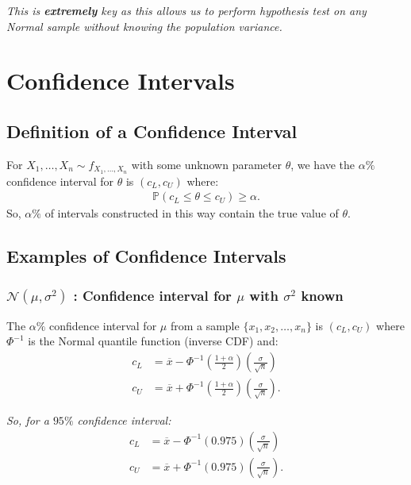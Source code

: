 \documentclass[a4paper, 12pt, twoside]{article}
\begin{document}
\textit{This is \textbf{extremely} key as this allows us to perform hypothesis
    test on any Normal sample without knowing the population variance.}

\newpage

\section{Confidence Intervals}

\subsection{Definition of a Confidence Interval}

For $X_1, \ldots, X_n \sim f_{X_1, \ldots, X_n}$ with some unknown
parameter $\theta$, we have the $\alpha\%$ confidence interval
for $\theta$ is $(c_L, c_U)$ where:
\begin{align*}
    \mathbb{P}(c_L \leq \theta \leq c_U) \geq \alpha.
\end{align*}
So, $\alpha\%$ of intervals constructed in this way contain the
true value of $\theta$.

\subsection{Examples of Confidence Intervals}

\subsubsection{$\mathcal{N}(\mu, \sigma^2)$ : Confidence
    interval for $\mu$ with $\sigma^2$ known}

The $\alpha\%$ confidence interval for $\mu$ from a sample
$\{x_1, x_2, \ldots, x_n\}$ is $(c_L, c_U)$ where $\Phi^{-1}$ is the
Normal quantile function (inverse CDF) and:
\begin{align*}
    c_L & = \overline{x} - \Phi^{-1}\left(\frac{1 + \alpha}{2}\right)
    \left(\frac{\sigma}{\sqrt{n}}\right)                              \\
    c_U & = \overline{x} + \Phi^{-1}\left(\frac{1 + \alpha}{2}\right)
    \left(\frac{\sigma}{\sqrt{n}}\right).
\end{align*}

\textit{So, for a $95\%$ confidence interval:}
\begin{align*}
    c_L & = \overline{x} - \Phi^{-1}\left(0.975\right)
    \left(\frac{\sigma}{\sqrt{n}}\right)               \\
    c_U & = \overline{x} + \Phi^{-1}\left(0.975\right)
    \left(\frac{\sigma}{\sqrt{n}}\right).
\end{align*}
\end{document}
